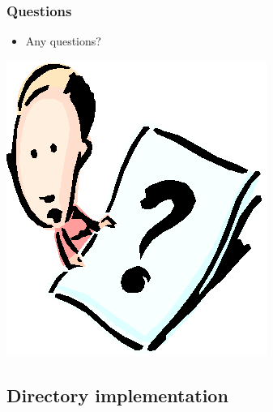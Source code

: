 \documentclass[CJKutf8,xcolor=pdftex,dvipsnames,table]{beamer}
\begin{document}
\begin{CJK*}{UTF8}{song}
  \begin{frame}
    \frametitle{Questions}
    \begin{itemize}
    \item Any questions?
    \end{itemize}
    \begin{center}
      \includegraphics[scale=.5]{question}
    \end{center}
  \end{frame}

  \subsection{Directory implementation}
  

\end{CJK*}
\end{document}
